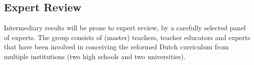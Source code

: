 








\subsection{Expert Review}
Intermediary results will be prone to expert review, by a carefully selected panel of experts. The group consists of (master) teachers, teacher educators and experts that have been involved in conceiving the reformed Dutch curriculum from multiple institutions (two high schools and two universities).

